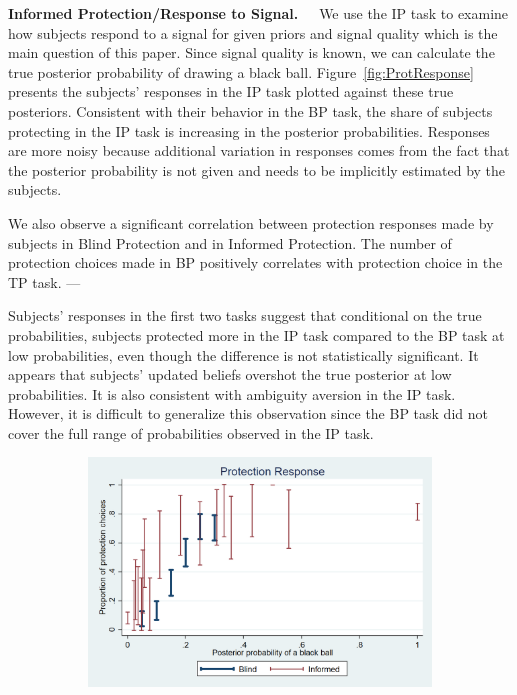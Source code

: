 \documentclass[12pt,a4paper]{article}
\newcommand{\aut}[1]{{\color{Red}#1}}
\begin{document}
\bigskip\noindent\textbf{Informed Protection/Response to Signal.}\ \ \ We use the IP task to examine how subjects respond to a signal for given priors and signal quality which is the main question of this paper. Since signal quality is known, we can calculate the true posterior probability of drawing a black ball. Figure~\ref{fig:ProtResponse} presents the subjects’ responses in the IP task plotted against these true posteriors. Consistent with their behavior in the BP task, the share of subjects protecting in the IP task is increasing in the posterior probabilities. Responses are more noisy because additional variation in responses comes from the fact that the posterior probability is not given and needs to be implicitly estimated by the subjects. 

We also observe a significant correlation between protection responses made by subjects in Blind Protection and in Informed Protection. The number of protection choices made in BP positively correlates with protection choice in the TP task. --- 

Subjects' responses in the first two tasks suggest that conditional on the true probabilities, subjects protected more in the IP task compared to the BP task at low probabilities, \aut{even though the difference is not statistically significant}. It appears that subjects’ updated beliefs overshot the true posterior at low probabilities. It is also consistent with ambiguity aversion in the IP task. However, it is difficult to generalize this observation since the BP task did not cover the full range of probabilities observed in the IP task.



\begin{figure}[H]
\centering
\caption{Average Protection Response} \label{fig:ProtResponse}
\begin{subfigure}[t]{.75\textwidth}
  \centering
  \includegraphics[width=\textwidth]{Graphs/ip_response_comp.png}
\end{subfigure}
%
\end{figure}
\end{document}
